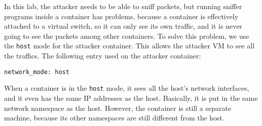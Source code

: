 In this lab, the attacker needs to be able to sniff packets,
but running sniffer programs inside a container has problems, because
a container is effectively attached to a virtual switch, 
so it can only see its own traffic, and it is never going to see 
the packets among other containers. To solve this problem,
we use the \texttt{host} mode for the attacker container. This
allows the attacker VM to see all the traffics. The following
entry used on the attacker container:

\begin{lstlisting}
network_mode: host
\end{lstlisting}

When a container is in the \texttt{host} mode,  it sees
all the host's network interfaces, and it even has the same
IP addresses as the host. Basically, it is put in the
same network namespace as the host. However, the container
is still a separate machine, because its other namespaces are
still different from the host.

